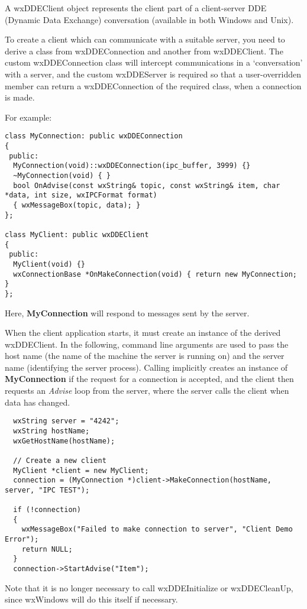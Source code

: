A wxDDEClient object represents the client part of a client-server DDE
(Dynamic Data Exchange) conversation (available in both
Windows and Unix).

To create a client which can communicate with a suitable server,
you need to derive a class from wxDDEConnection and another from wxDDEClient.
The custom wxDDEConnection class will intercept communications in
a `conversation' with a server, and the custom wxDDEServer is required
so that a user-overridden  member can return
a wxDDEConnection of the required class, when a connection is made.

For example:

\begin{verbatim}
class MyConnection: public wxDDEConnection
{
 public:
  MyConnection(void)::wxDDEConnection(ipc_buffer, 3999) {}
  ~MyConnection(void) { }
  bool OnAdvise(const wxString& topic, const wxString& item, char *data, int size, wxIPCFormat format)
  { wxMessageBox(topic, data); }
};

class MyClient: public wxDDEClient
{
 public:
  MyClient(void) {}
  wxConnectionBase *OnMakeConnection(void) { return new MyConnection; }
};

\end{verbatim}

Here, {\bf MyConnection} will respond to  messages sent
by the server.

When the client application starts, it must create an instance of the derived wxDDEClient. In the following, command line
arguments are used to pass the host name (the name of the machine the server is running
on) and the server name (identifying the server process). Calling \rtfsp
implicitly creates an instance of {\bf MyConnection} if the request for a
connection is accepted, and the client then requests an {\it Advise} loop
from the server, where the server calls the client when data has changed.

\begin{verbatim}
  wxString server = "4242";
  wxString hostName;
  wxGetHostName(hostName);

  // Create a new client
  MyClient *client = new MyClient;
  connection = (MyConnection *)client->MakeConnection(hostName, server, "IPC TEST");

  if (!connection)
  {
    wxMessageBox("Failed to make connection to server", "Client Demo Error");
    return NULL;
  }
  connection->StartAdvise("Item");
\end{verbatim}

Note that it is no longer necessary to call wxDDEInitialize or wxDDECleanUp, since
wxWindows will do this itself if necessary.

